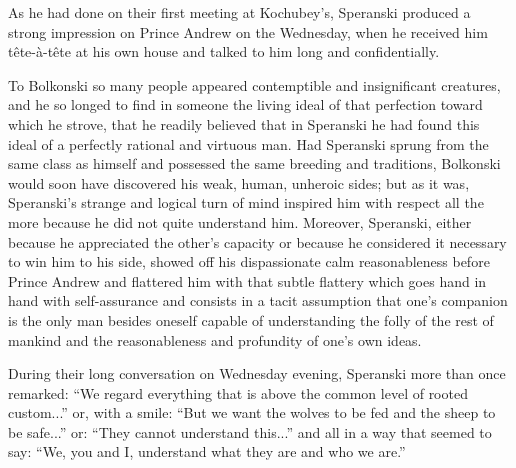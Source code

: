 As he had done on their first meeting at Kochubey's, Speranski
produced a strong impression on Prince Andrew on the Wednesday,
when he received him tête-à-tête at his own house and talked to
him long and confidentially.

To Bolkonski so many people appeared contemptible and
insignificant creatures, and he so longed to find in someone the
living ideal of that perfection toward which he strove, that he
readily believed that in Speranski he had found this ideal of a
perfectly rational and virtuous man. Had Speranski sprung from
the same class as himself and possessed the same breeding and
traditions, Bolkonski would soon have discovered his weak, human,
unheroic sides; but as it was, Speranski's strange and logical
turn of mind inspired him with respect all the more because he
did not quite understand him. Moreover, Speranski, either because
he appreciated the other's capacity or because he considered it
necessary to win him to his side, showed off his dispassionate
calm reasonableness before Prince Andrew and flattered him with
that subtle flattery which goes hand in hand with self-assurance
and consists in a tacit assumption that one's companion is the
only man besides oneself capable of understanding the folly of
the rest of mankind and the reasonableness and profundity of
one's own ideas.

During their long conversation on Wednesday evening, Speranski
more than once remarked: ``We regard everything that is above the
common level of rooted custom...'' or, with a smile: ``But we
want the wolves to be fed and the sheep to be safe...'' or:
``They cannot understand this...'' and all in a way that seemed
to say: ``We, you and I, understand what they are and who we
are.''

